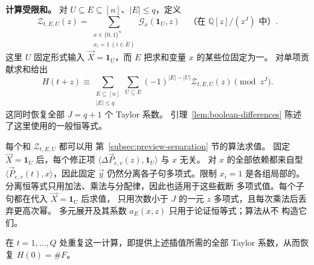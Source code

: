 \smallskip\noindent
\textbf{计算受限和。}
对 $U\subseteq E\subseteq[n]$、$|E|\le q$，定义
\begin{equation}\label{eq:outline-restricted-taylor-sum}
 \mathcal Z_{t,E,U}(z)=
 \sum_{\substack{x\in\{0,1\}^n\\x_i=1\ (i\in E)}}
                    \mathcal G_x(\mathbf1_U,z)
       \quad\text{（在 }\mathbb Q[z]/(z^J)\text{ 中）}.
\end{equation}
这里 $U$ 固定形式输入 $\vec X=\mathbf1_U$，而 $E$ 把求和变量
$x$ 的某些位固定为一。
对单项贡献求和给出
\begin{equation}\label{eq:outline-taylor-recovery}
 H(t+z)\equiv
 \sum_{\substack{E\subseteq[n]\\|E|\le q}}
       \sum_{U\subseteq E}(-1)^{|E|-|U|}
                         \mathcal Z_{t,E,U}(z)\pmod{z^J}.
\end{equation}
这同时恢复全部 $J=q+1$ 个 Taylor 系数。
引理~\ref{lem:boolean-differences} 陈述了这里使用的一般恒等式。

每个和 $\mathcal Z_{t,E,U}$ 都可以用
第~\ref{subsec:preview-separation} 节的算法求值。
固定 $\vec X=\mathbf1_U$ 后，每个修正项
$\langle\Delta\vec P_{e,v}(z),\mathbf1_U\rangle$ 与 $x$ 无关。
对 $x$ 的全部依赖都来自型
$\langle\vec P_{e,v}(t),x\rangle$，因此固定 $\vec y$
仍然分离各子句多项式。限制 $x_i=1$ 是各组局部的。
分离恒等式只用加法、乘法与分配律，因此也适用于这些截断
多项式值。每个子句都在代入 $\vec X=\mathbf1_U$ 后求值，
只用次数小于 $J$ 的一元 $z$ 多项式，且每次乘法后丢弃更高次幂。
多元展开及其系数 $a_E(x,z)$ 只用于论证恒等式；算法从不
构造它们。

在 $t=1,\ldots,Q$ 处重复这一计算，即提供上述插值所需的全部
Taylor 系数，从而恢复 $H(0)=\#F$。
